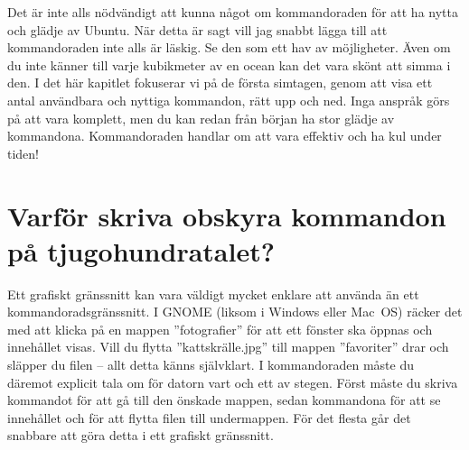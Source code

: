 \documentclass[a4paper,final]{memoir} %
\begin{document}

Det är inte alls nödvändigt att kunna något om kommandoraden för att ha nytta och glädje av Ubuntu. När detta är sagt vill jag snabbt lägga till att kommandoraden inte alls är läskig. Se den som ett hav av möjligheter. Även om du inte känner till varje kubikmeter av en ocean kan det vara skönt att simma i den. I det här kapitlet fokuserar vi på de första simtagen, genom att visa ett antal användbara och nyttiga kommandon, rätt upp och ned. Inga anspråk görs på att vara komplett, men du kan redan från början ha stor glädje av kommandona. Kommandoraden handlar om att vara effektiv och ha kul under tiden!

\section{Varför skriva obskyra kommandon på tjugohundratalet?}

Ett grafiskt gränssnitt kan vara väldigt mycket enklare att använda än ett kommandoradsgränssnitt. I GNOME (liksom i Windows eller Mac~OS) räcker det med att klicka på en mappen ''fotografier'' för att ett fönster ska öppnas och innehållet visas. Vill du flytta ''kattskrälle.jpg'' till mappen ''favoriter'' drar och släpper du  filen -- allt detta känns självklart. I kommandoraden måste du däremot explicit tala om för datorn vart och ett av stegen. Först måste du skriva kommandot   för att gå till den önskade mappen, sedan kommandona   för att se innehållet och  för att flytta filen till undermappen. För det flesta går det snabbare att göra detta i ett grafiskt gränssnitt. 
\end{document}

